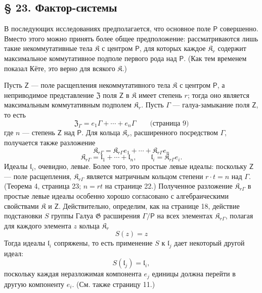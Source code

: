 \documentclass[11pt]{article}
\begin{document}
\subsection*{§ 23. Фактор-системы}\label{faktorensysteme}

В последующих исследованиях предполагается, что основное поле \(\mathsf P\) совершенно. Вместо этого можно принять более общее предположение: рассматриваются лишь такие некоммутативные тела \(\mathfrak K\) с центром \(\mathsf P\), для которых каждое \(\mathfrak K_r\) содержит максимальное коммутативное подполе первого рода над \(\mathsf P\). (Как тем временем показал Кёте, это верно для всякого \(\mathfrak K\).)

Пусть \(\mathsf{Z}\) --- поле расщепления некоммутативного тела \(\mathfrak K\) с центром \(\mathsf P\), а неприводимое представление \(\mathfrak Z\) поля \(\mathsf{Z}\) в \(\mathfrak K\) имеет степень \(r\); тогда оно является максимальным коммутативным подполем \(\mathfrak K_r\). Пусть \(\Gamma\) --- галуа-замыкание поля \(\mathsf{Z}\), то есть
\[
\mathfrak Z_\Gamma=e_1\Gamma+\cdots+e_n\Gamma
\qquad\text{(страница 9)}
\]
где \(n\) --- степень \(\mathsf{Z}\) над \(\mathsf P\). Для кольца \(\mathfrak K_r\), расширенного посредством \(\Gamma\), получается также разложение
\[
\mathfrak K_{r\Gamma}=\mathfrak K_{r\Gamma}e_1+\cdots+\mathfrak K_{r\Gamma}e_n
\]
\[
\mathfrak K_{r\Gamma}=\mathfrak l_1+\cdots+\mathfrak l_n,\qquad
\mathfrak l_i=\mathfrak K_{r\Gamma}e_i.
\]
Идеалы \(\mathfrak l_i\), очевидно, левые. Более того, это простые левые идеалы: поскольку \(\mathsf{Z}\) --- поле расщепления, \(\mathfrak K_{r\Gamma}\) является матричным кольцом степени \(r\cdot t=n\) над \(\Gamma\). (Теорема 4, страница 23; \(n=rt\) на странице 22.) Полученное разложение \(\mathfrak K_{r\Gamma}\) в простые левые идеалы особенно хорошо согласовано с алгебраическими свойствами \(\mathfrak K\) и \(\mathsf{Z}\). Действительно, определим, как на странице 18, действие подстановки \(S\) группы Галуа \(\mathfrak G\) расширения \(\Gamma/\mathsf P\) на всех элементах \(\mathfrak K_{r\Gamma}\), полагая для каждого элемента \(z\) кольца \(\mathfrak K_r\)
\[
S(z)=z
\]
Тогда идеалы \(\mathfrak l_i\) сопряжены, то есть применение \(S\) к \(\mathfrak l_j\) дает некоторый другой идеал:
\[
S(\mathfrak l_j)=\mathfrak l_i,
\]
поскольку каждая неразложимая компонента \(e_j\) единицы должна перейти в другую компоненту \(e_i\). (См. также страницу 11.)
\end{document}
